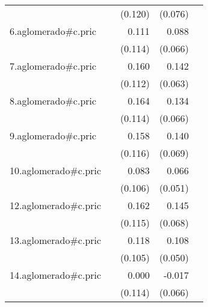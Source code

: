 {\begin{longtable}{l*{4}{D{.}{.}{-1}}}
            &                     &     (0.120)         &     (0.076)         &                     \\
\addlinespace
6.aglomerado#c.pric&                     &       0.111         &       0.088         &                     \\
            &                     &     (0.114)         &     (0.066)         &                     \\
\addlinespace
7.aglomerado#c.pric&                     &       0.160         &       0.142\sym{*}  &                     \\
            &                     &     (0.112)         &     (0.063)         &                     \\
\addlinespace
8.aglomerado#c.pric&                     &       0.164         &       0.134\sym{*}  &                     \\
            &                     &     (0.114)         &     (0.066)         &                     \\
\addlinespace
9.aglomerado#c.pric&                     &       0.158         &       0.140\sym{*}  &                     \\
            &                     &     (0.116)         &     (0.069)         &                     \\
\addlinespace
10.aglomerado#c.pric&                     &       0.083         &       0.066         &                     \\
            &                     &     (0.106)         &     (0.051)         &                     \\
\addlinespace
12.aglomerado#c.pric&                     &       0.162         &       0.145\sym{*}  &                     \\
            &                     &     (0.115)         &     (0.068)         &                     \\
\addlinespace
13.aglomerado#c.pric&                     &       0.118         &       0.108\sym{*}  &                     \\
            &                     &     (0.105)         &     (0.050)         &                     \\
\addlinespace
14.aglomerado#c.pric&                     &       0.000         &      -0.017         &                     \\
            &                     &     (0.114)         &     (0.066)         &                     \\

\end{longtable}}

